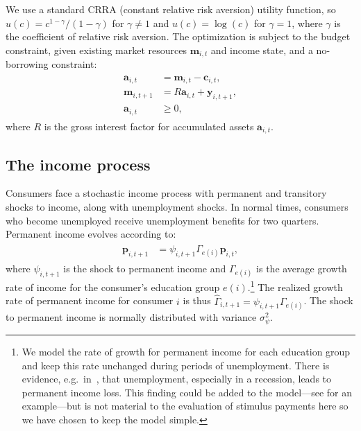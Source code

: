 \documentclass[\PathToRoot/\ProjectName]{subfiles}
\begin{document}
We use a standard CRRA (constant relative risk aversion) utility function, so $u(c) = c^{1-\gamma}/(1-\gamma)$ for $\gamma \neq 1$ and $u(c) = \log(c)$ for $\gamma=1$, where $\gamma$ is the coefficient of relative risk aversion.
The optimization is subject to the budget constraint, given existing market resources $\mathbf{m}_{i,t}$ and income state, and a no-borrowing constraint:
\begin{equation}
  \begin{gathered}
    \begin{aligned}
      \mathbf{a}_{i,t}   & = \mathbf{m}_{i,t} - \mathbf{c}_{i,t},     \\
      \mathbf{m}_{i,t+1} & = R \mathbf{a}_{i,t} + \mathbf{y}_{i,t+1}, \\
      \mathbf{a}_{i,t}   & \geq 0,
    \end{aligned}
  \end{gathered}
\end{equation}
where $R$ is the gross interest factor for accumulated assets $\mathbf{a}_{i,t}$.

\subsection{The income process}\whenintegrated{\label{the-income-process}}

Consumers face a stochastic income process with permanent and transitory shocks to income, along with unemployment shocks.
In normal times, consumers who become unemployed receive unemployment benefits for two quarters.
Permanent income evolves according to:
\begin{equation}
  \begin{gathered}
    \begin{aligned}
      \mathbf{p}_{i,t+1} & = \psi_{i,t+1}\Gamma_{e(i)}\mathbf{p}_{i,t},
    \end{aligned}
  \end{gathered}
\end{equation}
where $\psi_{i,t+1}$ is the shock to permanent income and $\Gamma_{e(i)}$ is the average growth rate of income for the consumer's education group $e(i)$.\footnote{We model the rate of growth for permanent income for each education group and keep this rate unchanged during periods of unemployment.
  There is evidence, e.g.\ in~\cite{davis-recessions-2011}, that unemployment, especially in a recession, leads to permanent income loss.
  This finding could be added to the model---see \cite{carroll2020modeling} for an example---but is not material to the evaluation of stimulus payments here so we have chosen to keep the model simple.
} The realized growth rate of permanent income for consumer $i$ is thus $\hat{\Gamma}_{i,t+1} = \psi_{i,t+1} \Gamma_{e(i)}$.
The shock to permanent income is normally distributed with variance $\sigma_{\psi}^2$.
\end{document}
